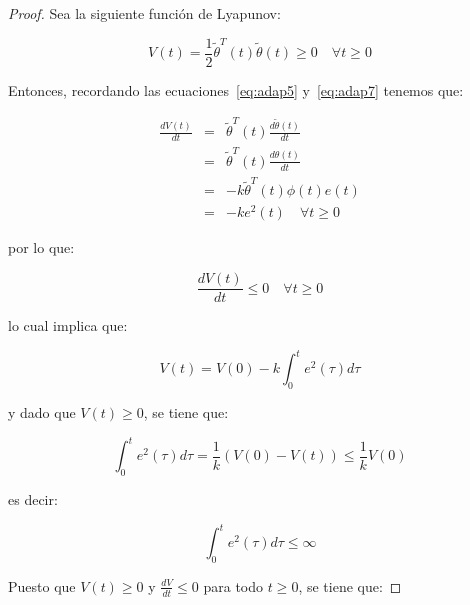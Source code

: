             \begin{proof}
                Sea la siguiente función de Lyapunov:

                \begin{equation*}
                    V(t) = \frac{1}{2} \tilde{\theta}^T(t) \tilde{\theta}(t) \ge 0 \quad \forall t \ge 0
                \end{equation*}

                Entonces, recordando las ecuaciones~\ref{eq:adap5} y~\ref{eq:adap7} tenemos que:

                \begin{eqnarray*}
                    \frac{d V(t)}{dt} & = & \tilde{\theta}^T(t) \frac{d \tilde{\theta}(t)}{dt} \\
                    & = & \tilde{\theta}^T(t) \frac{d \theta(t)}{dt} \\
                    & = & -k \tilde{\theta}^T(t) \phi(t) e(t) \\
                    & = & -k e^2(t) \quad \forall t \ge 0
                \end{eqnarray*}

                por lo que:

                \begin{equation*}
                    \frac{d V(t)}{dt} \le 0 \quad \forall t \ge 0
                \end{equation*}

                lo cual implica que:

                \begin{equation*}
                    V(t) = V(0) - k \int_0^t e^2(\tau) d\tau
                \end{equation*}

                y dado que $V(t) \ge 0$, se tiene que:

                \begin{equation*}
                    \int_0^t e^2(\tau) d\tau = \frac{1}{k} \left( V(0) - V(t) \right) \le \frac{1}{k} V(0)
                \end{equation*}

                es decir:

                \begin{equation*}
                    \int_0^t e^2(\tau) d\tau \le \infty
                \end{equation*}

                Puesto que $V(t) \ge 0$ y $\frac{dV}{dt} \le 0$ para todo $t \ge 0$, se tiene que:


\end{proof}
